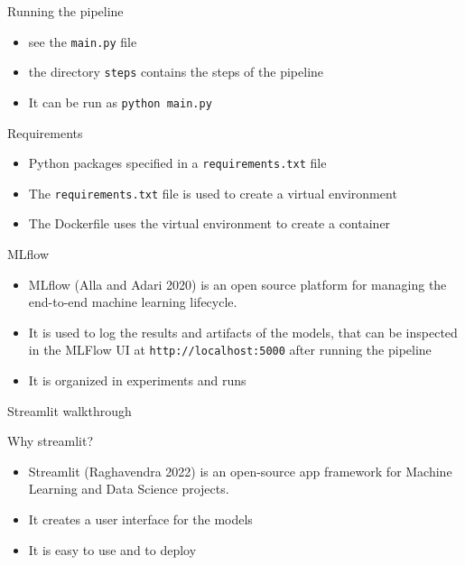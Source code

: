 \documentclass[
  ignorenonframetext,
]{beamer}
\providecommand{\tightlist}{%
  \setlength{\itemsep}{0pt}\setlength{\parskip}{0pt}}
\begin{document}
\begin{frame}[fragile]
\begin{block}{Running the pipeline}
\label{running-the-pipeline}
\begin{itemize}
\tightlist
\item
  see the \texttt{main.py} file
\item
  the directory \texttt{steps} contains the steps of the pipeline
\item
  It can be run as \texttt{python\ main.py}
\end{itemize}
\end{block}
\end{frame}

\begin{frame}[fragile]
\begin{block}{Requirements}
\label{requirements}
\begin{itemize}
\tightlist
\item
  Python packages specified in a \texttt{requirements.txt} file
\item
  The \texttt{requirements.txt} file is used to create a virtual
  environment
\item
  The Dockerfile uses the virtual environment to create a container
\end{itemize}
\end{block}
\end{frame}

\begin{frame}[fragile]
\begin{block}{MLflow}
\label{mlflow}
\begin{itemize}
\tightlist
\item
  MLflow (Alla and Adari 2020) is an open source platform for managing
  the end-to-end machine learning lifecycle.
\item
  It is used to log the results and artifacts of the models, that can be
  inspected in the MLFlow UI at \texttt{http://localhost:5000} after
  running the pipeline
\item
  It is organized in experiments and runs
\end{itemize}
\end{block}
\end{frame}

\begin{frame}{Streamlit walkthrough}
\label{streamlit-walkthrough}
\begin{block}{Why streamlit?}
\label{why-streamlit}
\begin{itemize}
\tightlist
\item
  Streamlit (Raghavendra 2022) is an open-source app framework for
  Machine Learning and Data Science projects.
\item
  It creates a user interface for the models
\item
  It is easy to use and to deploy
\end{itemize}
\end{block}
\end{frame}
\end{document}
